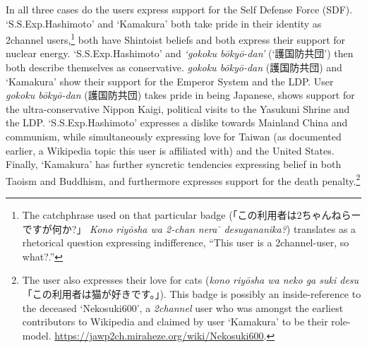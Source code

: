 \documentclass[10pt,british,A4paper,,openany]{memoir}
\begin{document}
In all three cases do the users express support for the Self Defense
Force (SDF). `S.S.Exp.Hashimoto' and `Kamakura' both take pride in their
identity as 2channel users,\footnote{The catchphrase used on that
  particular badge (「この利用者は2ちゃんねらーですが何か?」 \emph{Kono
  riyōsha wa 2-chan nera ̄ desugananika?}) translates as a rhetorical
  question expressing indifference, ``This user is a 2channel-user, so
  what?.''} both have Shintoist beliefs and both express their support
for nuclear energy. `S.S.Exp.Hashimoto' and \emph{`gokoku bōkyō-dan'}
(`護国防共団') then both describe themselves as conservative.
\emph{gokoku bōkyō-dan} (護国防共団) and `Kamakura' show their support
for the Emperor System and the LDP. User \emph{gokoku bōkyō-dan}
(護国防共団) takes pride in being Japanese, shows support for the
ultra-conservative Nippon Kaigi, political visits to the Yasukuni Shrine
and the LDP. `S.S.Exp.Hashimoto' expresses a dislike towards Mainland
China and communism, while simultaneously expressing love for Taiwan (as
documented earlier, a Wikipedia topic this user is affiliated with) and
the United States. Finally, `Kamakura' has further syncretic tendencies
expressing belief in both Taoism and Buddhism, and furthermore expresses
support for the death penalty.\footnote{The user also expresses their
  love for cats (\emph{kono riyōsha wa neko ga suki desu}
  「この利用者は猫が好きです。」). This badge is possibly an
  inside-reference to the deceased `Nekosuki600', a \emph{2channel} user
  who was amongst the earliest contributors to Wikipedia and claimed by
  user `Kamakura' to be their role-model.
  \url{https://jawp2ch.miraheze.org/wiki/Nekosuki600}.}
\end{document}
